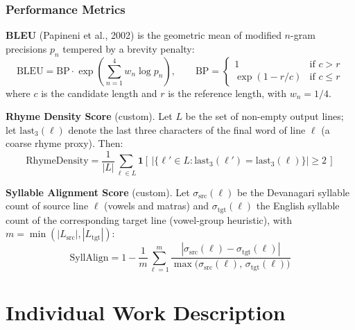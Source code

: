 \documentclass[11pt]{article}
\begin{document}
\subsubsection{Performance Metrics}
\textbf{BLEU} (Papineni et al., 2002) is the geometric mean of modified $n$-gram precisions $p_n$ tempered by a brevity penalty:
\begin{equation}
\mathrm{BLEU} = \mathrm{BP} \cdot \exp\!\left(\sum_{n=1}^{4} w_n \log p_n\right), \qquad
\mathrm{BP} = \begin{cases} 1 & \text{if } c > r \\ \exp(1-r/c) & \text{if } c \le r \end{cases}
\end{equation}
where $c$ is the candidate length and $r$ is the reference length, with $w_n = 1/4$.

\textbf{Rhyme Density Score} (custom). Let $L$ be the set of non-empty output lines; let $\mathrm{last}_3(\ell)$ denote the last three characters of the final word of line $\ell$ (a coarse rhyme proxy). Then:
\begin{equation}
\mathrm{RhymeDensity} = \frac{1}{|L|} \sum_{\ell \in L} \mathbf{1}\!\left[\,\big|\{\ell' \in L : \mathrm{last}_3(\ell') = \mathrm{last}_3(\ell)\}\big| \ge 2\,\right]
\end{equation}

\textbf{Syllable Alignment Score} (custom). Let $\sigma_{\text{src}}(\ell)$ be the Devanagari syllable count of source line $\ell$ (vowels and matras) and $\sigma_{\text{tgt}}(\ell)$ the English syllable count of the corresponding target line (vowel-group heuristic), with $m = \min(|L_{\text{src}}|, |L_{\text{tgt}}|)$:
\begin{equation}
\mathrm{SyllAlign} = 1 - \frac{1}{m} \sum_{\ell=1}^{m} \frac{|\sigma_{\text{src}}(\ell) - \sigma_{\text{tgt}}(\ell)|}{\max\!\big(\sigma_{\text{src}}(\ell),\, \sigma_{\text{tgt}}(\ell)\big)}
\end{equation}

\section{Individual Work Description}
\end{document}
